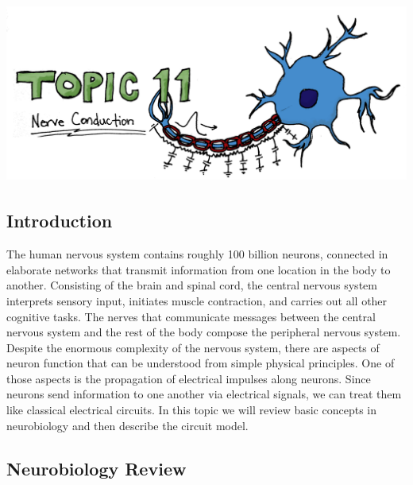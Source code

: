 \setcounter{chapter}{11}
\setcounter{section}{0}
\setcounter{figure}{0}
\setcounter{equation}{0}
\setcounter{table}{0}
\chapter*{\includegraphics[width=\textwidth]{./figures/Topic11/Topic11.jpg}}

\section{Introduction}

The human nervous system contains roughly 100 billion neurons, connected in elaborate networks that transmit information from one location in the body to another.  Consisting of the brain and spinal cord, the central nervous system interprets sensory input, initiates muscle contraction, and carries out all other cognitive tasks.  The nerves that communicate messages between the central nervous system and the rest of the body compose the peripheral nervous system.
Despite the enormous complexity of the nervous system, there are aspects of neuron function that can be understood from simple physical principles. One of those aspects is the propagation of electrical impulses along neurons.  Since neurons send information to one another via electrical signals, we can treat them like classical electrical circuits.  In this topic we will review basic concepts in neurobiology and then describe the circuit model.  

\section{Neurobiology Review}

